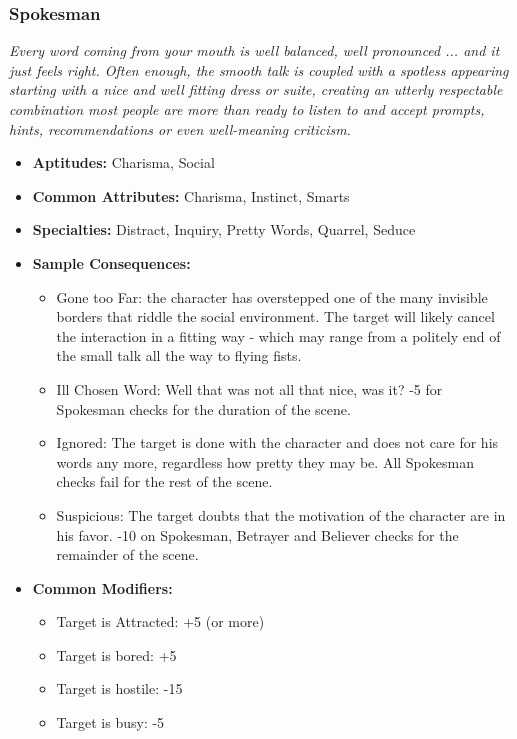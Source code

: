 \subsubsection{Spokesman}\label{Spokesman}
\textit{Every word coming from your mouth is well balanced, well pronounced ... and it just feels right.
Often enough, the smooth talk is coupled with a spotless appearing starting with a nice and well fitting dress or suite, creating an utterly respectable combination most people are more than ready to listen to and accept prompts, hints, recommendations or even well-meaning criticism.}
\begin{itemize}
	\item \textbf{Aptitudes:} Charisma, Social
	\item \textbf{Common Attributes:} Charisma, Instinct, Smarts
	\item \textbf{Specialties:} Distract, Inquiry, Pretty Words, Quarrel, Seduce
	\item \textbf{Sample Consequences:} 
	\begin{itemize}
		\item Gone too Far: the character has overstepped one of the many invisible borders that riddle the social environment. The target will likely cancel the interaction in a fitting way - which may range from a politely end of the small talk all the way to flying fists.
		\item Ill Chosen Word: Well that was not all that nice, was it? -5 for Spokesman checks for the duration of the scene.
		\item Ignored: The target is done with the character and does not care for his words any more, regardless how pretty they may be. All Spokesman checks fail for the rest of the scene.
		\item Suspicious: The target doubts that the motivation of the character are in his favor. -10 on Spokesman, Betrayer and Believer checks for the remainder of the scene.
	\end{itemize}
	\item \textbf{Common Modifiers:}
	\begin{itemize}
		\item Target is Attracted: +5 (or more)
		\item Target is bored: +5
		\item Target is hostile: -15
		\item Target is busy: -5
	\end{itemize}
\end{itemize}

